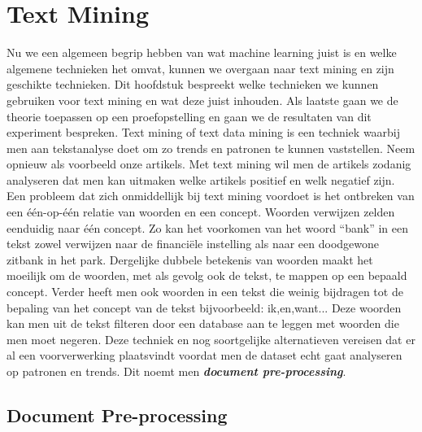 \chapter{Text Mining}\label{Text Mining}

Nu we een algemeen begrip hebben van wat machine learning juist is en welke algemene technieken het omvat, kunnen we overgaan naar text mining en zijn geschikte technieken. Dit hoofdstuk bespreekt welke technieken we kunnen gebruiken voor text mining en wat deze juist inhouden. Als laatste gaan we de theorie toepassen op een proefopstelling en gaan we de resultaten van dit experiment bespreken. 
\newline
%
Text mining of text data mining is een techniek waarbij men aan tekstanalyse doet om zo trends en patronen te kunnen vaststellen. Neem opnieuw als voorbeeld onze artikels. Met text mining wil men de artikels zodanig analyseren dat men kan uitmaken welke artikels positief en welk negatief zijn.
Een probleem dat zich onmiddellijk bij text mining voordoet is het ontbreken van een  \'e\'en-op-\'e\'en relatie van woorden en een concept. Woorden verwijzen zelden eenduidig naar \'e\'en concept. Zo kan het voorkomen van het woord ``bank'' in een tekst zowel verwijzen naar de financi\"ele instelling als naar een doodgewone zitbank in het park. Dergelijke dubbele betekenis van woorden maakt het moeilijk om de woorden, met als gevolg ook de tekst, te mappen op een bepaald concept.
% 
Verder heeft men ook woorden in een tekst die weinig bijdragen tot de bepaling van het concept van de tekst bijvoorbeeld: ik,en,want...
Deze woorden kan men uit de tekst filteren door een database aan te leggen met woorden die men moet negeren. Deze techniek en nog soortgelijke alternatieven vereisen dat er al een voorverwerking plaatsvindt voordat men de dataset echt gaat analyseren op patronen en trends. Dit noemt men \textbf{\textit{document pre-processing}}.

\section{Document Pre-processing }\label{Document Pre-processing}

